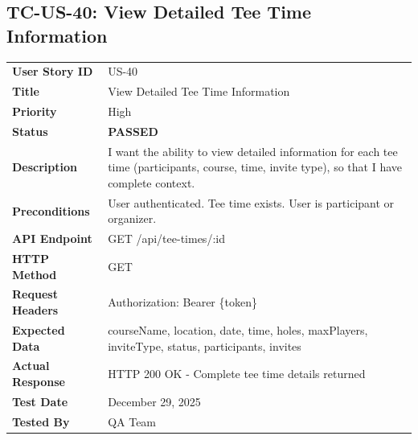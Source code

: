 \documentclass[11pt,a4paper]{article}
\newcommand{\passed}{\textcolor{pass}{\textbf{PASSED}}}
\begin{document}
\vspace{0.5cm}


\subsection{TC-US-40: View Detailed Tee Time Information}

\begin{tabularx}{\textwidth}{|p{3.2cm}|Y|}
\hline
{}
 \\
\hline
\textbf{User Story ID} & US-40 \\
\hline
\textbf{Title} & View Detailed Tee Time Information \\
\hline
\textbf{Priority} & High \\
\hline
\textbf{Status} & \passed \\
\hline
\textbf{Description} & I want the ability to view detailed information for each tee time (participants, course, time, invite type), so that I have complete context. \\
\hline
\textbf{Preconditions} & User authenticated. Tee time exists. User is participant or organizer. \\
\hline
\textbf{API Endpoint} & GET /api/tee-times/:id \\
\hline
\textbf{HTTP Method} & GET \\
\hline
\textbf{Request Headers} & Authorization: Bearer \{token\} \\
\hline
\textbf{Expected Data} & courseName, location, date, time, holes, maxPlayers, inviteType, status, participants, invites \\
\hline
\textbf{Actual Response} & HTTP 200 OK - Complete tee time details returned \\
\hline
\textbf{Test Date} & December 29, 2025 \\
\hline
\textbf{Tested By} & QA Team \\
\hline
\end{tabularx}
\end{document}
